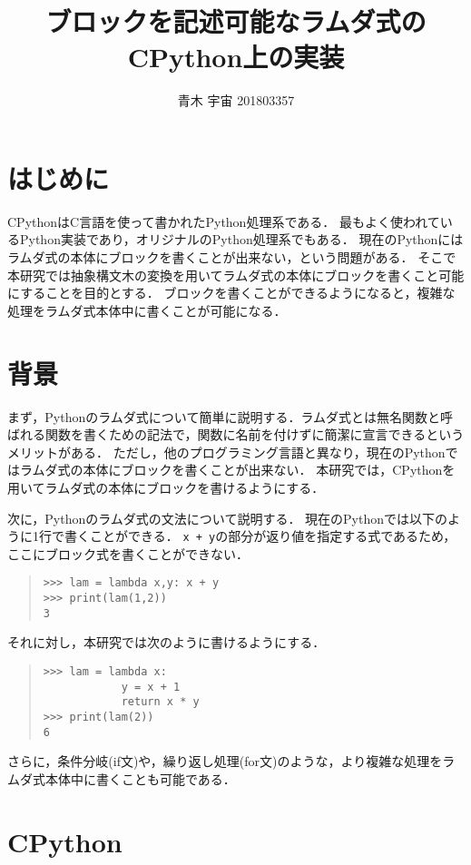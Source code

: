 \documentclass[twocolumn]{jsarticle}
\author{青木 宇宙 201803357}
\title{ブロックを記述可能なラムダ式のCPython上の実装}
\date{} %
\begin{document}
\maketitle
\thispagestyle{fancy}

\section{はじめに}
CPythonはC言語を使って書かれたPython処理系である．
最もよく使われているPython実装であり，オリジナルのPython処理系でもある．
現在のPythonにはラムダ式の本体にブロックを書くことが出来ない，という問題がある．
そこで本研究では抽象構文木の変換を用いてラムダ式の本体にブロックを書くこと可能にすることを目的とする．
ブロックを書くことができるようになると，複雑な処理をラムダ式本体中に書くことが可能になる．


\section{背景}
まず，Pythonのラムダ式について簡単に説明する．ラムダ式とは無名関数と呼ばれる関数を書くための記法で，関数に名前を付けずに簡潔に宣言できるというメリットがある．
ただし，他のプログラミング言語と異なり，現在のPythonではラムダ式の本体にブロックを書くことが出来ない．
本研究では，CPythonを用いてラムダ式の本体にブロックを書けるようにする．

次に，Pythonのラムダ式の文法について説明する．
現在のPythonでは以下のように1行で書くことができる．
\texttt{x + y}の部分が返り値を指定する式であるため，ここにブロック式を書くことができない．
\begin{quote}
\setlength{\baselineskip}{12pt}
\begin{verbatim}
>>> lam = lambda x,y: x + y
>>> print(lam(1,2))
3
\end{verbatim}
\end{quote}

それに対し，本研究では次のように書けるようにする．
\begin{quote}
\setlength{\baselineskip}{12pt}
\begin{verbatim}
>>> lam = lambda x:
            y = x + 1
            return x * y
>>> print(lam(2))
6
\end{verbatim}
\end{quote}
さらに，条件分岐(if文)や，繰り返し処理(for文)のような，より複雑な処理をラムダ式本体中に書くことも可能である．

\section{CPython}
\end{document}
